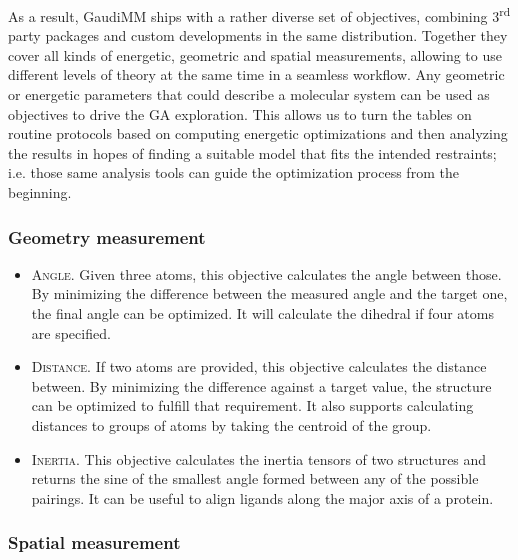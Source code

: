 As a result, GaudiMM ships with a rather diverse set of objectives, combining 3\textsuperscript{rd} party packages and custom developments in the same distribution. Together they cover all kinds of energetic, geometric and spatial measurements, allowing to use different levels of theory at the same time in a seamless workflow. Any geometric or energetic parameters that could describe a molecular system can be used as objectives to drive the GA exploration. This allows us to turn the tables on routine protocols based on computing energetic optimizations and then analyzing the results in hopes of finding a suitable model that fits the intended restraints; i.e. those same analysis tools can guide the optimization process from the beginning.

\subsubsection{Geometry measurement}
\begin{itemize}
	\item \textsc{Angle}. Given three atoms, this objective calculates the angle between those. By minimizing the difference between the measured angle and the target one, the final angle can be optimized. It will calculate the dihedral if four atoms are specified.

	\item \textsc{Distance}. If two atoms are provided, this objective calculates the distance between. By minimizing the difference against a target value, the structure can be optimized to fulfill that requirement. It also supports calculating distances to groups of atoms by taking the centroid of the group.

	\item \textsc{Inertia}. This objective calculates the inertia tensors of two structures and returns the sine of the smallest angle formed between any of the possible pairings. It can be useful to align ligands along the major axis of a protein.


\end{itemize}\subsubsection{Spatial measurement}
